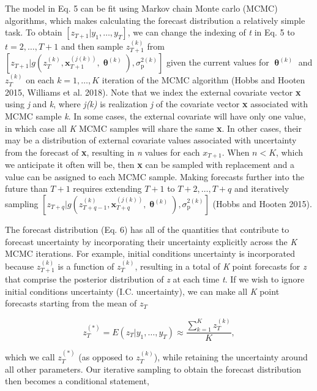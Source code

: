 \documentclass[12pt,]{article}
\begin{document}
The model in Eq. 5 can be fit using Markov chain Monte carlo (MCMC)
algorithms, which makes calculating the forecast distribution a
relatively simple task. To obtain
\(\left[z_{T+1} | y_1,\dots,y_T \right]\), we can change the indexing of
\emph{t} in Eq. 5 to \(t = 2,\dots,T+1\) and then sample
\(z_{T+1}^{(k)}\) from
\(\left[z_{T+1} | g(z_T^{(k)}, \textbf{x}_{T+1}^{(j(k))}, \bm{\uptheta}^{(k)}), \sigma^{2(k)}_{\text{p}} \right]\)
given the current values for \(\bm{\uptheta}^{(k)}\) and \(z_{T}^{(k)}\)
on each \(k = 1,\dots,K\) iteration of the MCMC algorithm (Hobbs and
Hooten 2015, Williams et al. 2018). Note that we index the external
covariate vector \textbf{x} using \emph{j} and \emph{k}, where
\emph{j(k)} is realization \emph{j} of the covariate vector \textbf{x}
associated with MCMC sample \emph{k}. In some cases, the external
covariate will have only one value, in which case all \emph{K} MCMC
samples will share the same \textbf{x}. In other cases, their may be a
distribution of external covariate values associated with uncertainty
from the forecast of \textbf{x}, resulting in \emph{n} values for each
\(x_{T+1}\). When \(n < K\), which we anticipate it often will be, then
\textbf{x} can be sampled with replacement and a value can be assigned
to each MCMC sample. Making forecasts further into the future than
\(T+1\) requires extending \(T+1\) to \(T+2,\dots,T+q\) and iteratively
sampling
\(\left[z_{T+q} | g(z_{T+q-1}^{(k)}, \textbf{x}_{T+q}^{(j(k))},\bm{\uptheta}^{(k)}), \sigma^{2(k)}_{\text{p}} \right]\)
(Hobbs and Hooten 2015).

The forecast distribution (Eq. 6) has all of the quantities that
contribute to forecast uncertainty by incorporating their uncertainty
explicitly across the \emph{K} MCMC iterations. For example, initial
conditions uncertainty is incorporated because \(z_{T+1}^{(k)}\) is a
function of \(z_{T}^{(k)}\), resulting in a total of \emph{K} point
forecasts for \emph{z} that comprise the posterior distribution of
\emph{z} at each time \emph{t}. If we wish to ignore initial conditions
uncertainty (I.C. uncertainty), we can make all \emph{K} point forecasts
starting from the mean of \(z_{T}\)

\begin{equation}
z_{T}^{(*)} = E(z_{T} | y_1,\dots,y_T) \approx \frac{\sum^K_{k=1} z_{T}^{(k)}}{K},
\end{equation}

\noindent{}which we call \(z^{(*)}_T\) (as opposed to \(z^{(k)}_T\)),
while retaining the uncertainty around all other parameters. Our
iterative sampling to obtain the forecast distribution then becomes a
conditional statement,
\end{document}
